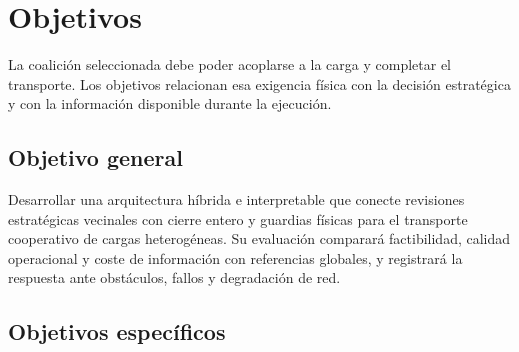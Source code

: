 \section{Objetivos}
\label{sec:objectives}

La coalición seleccionada debe poder acoplarse a la carga y completar el
transporte. Los objetivos relacionan esa exigencia física con la decisión
estratégica y con la información disponible durante la ejecución.

\subsection{Objetivo general}

Desarrollar una arquitectura híbrida e interpretable que conecte revisiones estratégicas
vecinales con cierre entero y guardias físicas para el transporte cooperativo de
cargas heterogéneas. Su evaluación comparará factibilidad, calidad operacional y
coste de información con referencias globales, y registrará la respuesta ante
obstáculos, fallos y degradación de red.

\subsection{Objetivos específicos}

